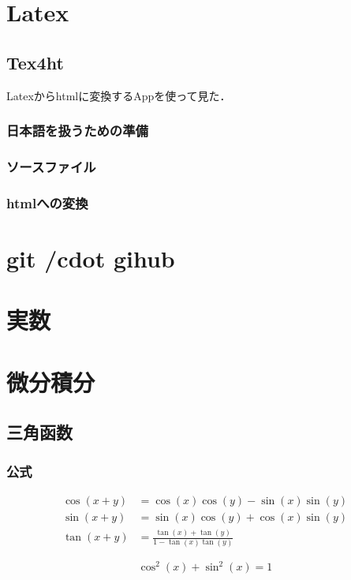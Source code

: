 \documentclass{book} %
\begin{document}
	\tableofcontents
	\part{Latex}
		\chapter{Tex4ht}
			Latexからhtmlに変換するAppを使って見た．
			\section{日本語を扱うための準備}
			\section{ソースファイル}
			\section{htmlへの変換}

	\part{git /cdot gihub}
	\part{実数}
	\part{微分積分}
		\chapter{三角函数}
			\section{公式}
				\begin{thm}[加法定理]
						\begin{align}
							\cos(x+y) &= \cos(x)\cos(y) - \sin(x)\sin(y) \\
							\sin(x+y) &= \sin(x) \cos(y) + \cos(x)\sin(y) \\
							\tan(x+y) &= \frac{\tan(x) + \tan(y)}{1 - \tan(x)\tan(y)}
						\end{align}
				\end{thm}
			
				\begin{thm}[ピタゴラスの基本三角函数公式]
					\begin{equation}
						\cos^2(x) + \sin^2(x) = 1
					\end{equation}
				\end{thm}
			
\end{document}

